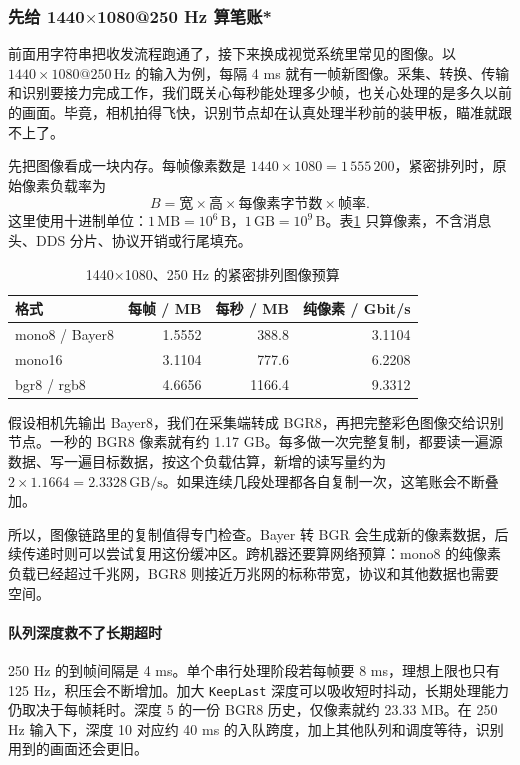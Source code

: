 \subsubsection{先给 1440\texorpdfstring{$\times$}{×}1080@250 Hz 算笔账*}
\label{sec:ros2-image-budget}
前面用字符串把收发流程跑通了，接下来换成视觉系统里常见的图像。以 $1440\times1080@250\,\mathrm{Hz}$ 的输入为例，每隔 4 ms 就有一帧新图像。采集、转换、传输和识别要接力完成工作，我们既关心每秒能处理多少帧，也关心处理的是多久以前的画面。毕竟，相机拍得飞快，识别节点却在认真处理半秒前的装甲板，瞄准就跟不上了。

先把图像看成一块内存。每帧像素数是 $1440\times1080=1\,555\,200$，紧密排列时，原始像素负载率为
\[
  B=\text{宽}\times\text{高}\times\text{每像素字节数}\times\text{帧率}.
\]
这里使用十进制单位：$1\,\mathrm{MB}=10^6\,\mathrm{B}$，$1\,\mathrm{GB}=10^9\,\mathrm{B}$。表\ref{tab:ros2-image-budget} 只算像素，不含消息头、DDS 分片、协议开销或行尾填充。
\begin{table}[htbp]
\centering
\caption{1440×1080、250 Hz 的紧密排列图像预算}
\label{tab:ros2-image-budget}
\begin{tabular}{lrrr}
\toprule
格式 & 每帧 / MB & 每秒 / MB & 纯像素 / Gbit/s\\
\midrule
mono8 / Bayer8 & 1.5552 & 388.8 & 3.1104\\
mono16 & 3.1104 & 777.6 & 6.2208\\
bgr8 / rgb8 & 4.6656 & 1166.4 & 9.3312\\
\bottomrule
\end{tabular}
\end{table}

\begin{example}
假设相机先输出 Bayer8，我们在采集端转成 BGR8，再把完整彩色图像交给识别节点。一秒的 BGR8 像素就有约 1.17 GB。每多做一次完整复制，都要读一遍源数据、写一遍目标数据，按这个负载估算，新增的读写量约为 $2\times1.1664=2.3328\,\mathrm{GB/s}$。如果连续几段处理都各自复制一次，这笔账会不断叠加。

所以，图像链路里的复制值得专门检查。Bayer 转 BGR 会生成新的像素数据，后续传递时则可以尝试复用这份缓冲区。跨机器还要算网络预算：mono8 的纯像素负载已经超过千兆网，BGR8 则接近万兆网的标称带宽，协议和其他数据也需要空间。
\end{example}

\paragraph*{队列深度救不了长期超时}
250 Hz 的到帧间隔是 4 ms。单个串行处理阶段若每帧要 8 ms，理想上限也只有 125 Hz，积压会不断增加。加大 \texttt{KeepLast} 深度可以吸收短时抖动，长期处理能力仍取决于每帧耗时。深度 5 的一份 BGR8 历史，仅像素就约 23.33 MB。在 250 Hz 输入下，深度 10 对应约 40 ms 的入队跨度，加上其他队列和调度等待，识别用到的画面还会更旧。

